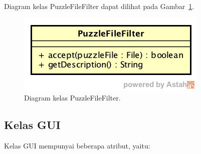 Diagram kelas PuzzleFileFilter dapat dilihat pada Gambar~\ref{fig:diagramkelaspuzzlefilefilter}.

\begin{figure}
\centering
\captionsetup{justification=centering}
\includegraphics[scale=0.5]{Gambar/Perancangan/DiagramKelasPuzzleFileFilter.png}
\caption[Diagram kelas PuzzleFileFilter.]{Diagram kelas PuzzleFileFilter.}
\label{fig:diagramkelaspuzzlefilefilter}
\end{figure}

\subsection{Kelas GUI}
\label{sec:kelasgui}

Kelas GUI mempunyai beberapa atribut, yaitu:

